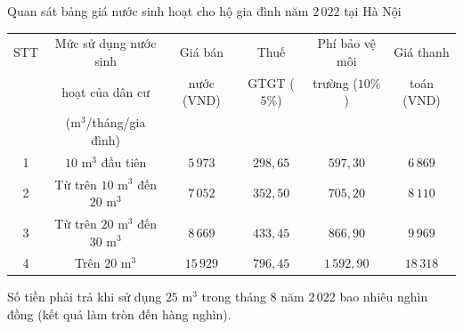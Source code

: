 \begin{ex}%
	Quan sát bảng giá nước sinh hoạt cho hộ gia đình năm $2\,022$ tại Hà Nội
	\begin{center}
		\begin{tabular}{|c|c|c|c|c|c|}
			\hline
			STT & Mức sử dụng nước sinh & Giá bán & Thuế & Phí bảo vệ môi & Giá thanh \\
			& hoạt của dân cư  & nước (VND) & GTGT ($5\%$) & trường ($10\%$) & toán (VND) \\
			& (m$^3$/tháng/gia đình)        &              &              &                 & \\
			\hline
			1 & $10$ m$^3$ đầu tiên & $5\,973$ & $298{,}65$ & $597{,}30$ & $6\,869$ \\
			\hline
			2 & Từ trên $10$ m$^3$ đến $20$ m$^3$ & $7\,052$ & $352{,}50$ & $705{,}20$ & $8\,110$ \\
			\hline
			3 & Từ trên $20$ m$^3$ đến $30$ m$^3$ & $8\,669$ & $433{,}45$ & $866{,}90$ & $9\,969$ \\
			\hline
			4 & Trên $20$ m$^3$ & $15\,929$ & $796{,}45$ & $1\,592{,}90$ & $18\,318$ \\
			\hline
		\end{tabular}
	\end{center}
	Số tiền phải trả khi sử dụng $25$ m$^3$ trong tháng $8$ năm $2\,022$ bao nhiêu nghìn đồng (kết quả làm tròn đến hàng nghìn).
\end{ex}
 
\setcounter{ex}{0}

